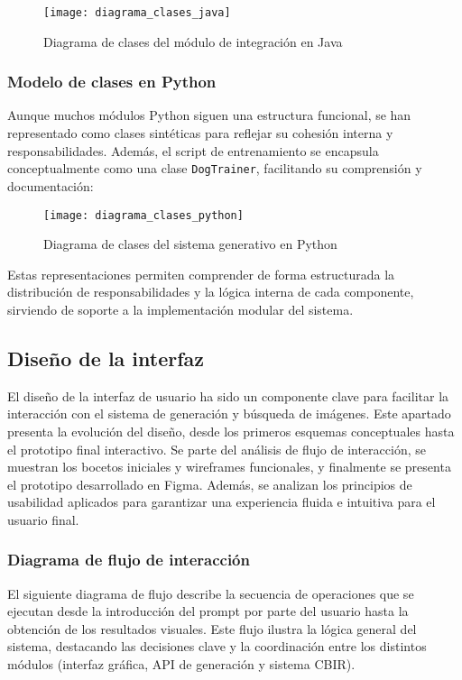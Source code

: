 \begin{figure}[H]
    \centering
    \texttt{[image: diagrama\_clases\_java]}
    \caption{Diagrama de clases del módulo de integración en Java}
    \label{fig:clases-java}
\end{figure}

\subsubsection{Modelo de clases en Python}

Aunque muchos módulos Python siguen una estructura funcional, se han representado como clases sintéticas para reflejar su cohesión interna y responsabilidades. Además, el script de entrenamiento se encapsula conceptualmente como una clase \texttt{DogTrainer}, facilitando su comprensión y documentación:

\begin{figure}[H]
    \centering
    \texttt{[image: diagrama\_clases\_python]}
    \caption{Diagrama de clases del sistema generativo en Python}
    \label{fig:clases-python}
\end{figure}

Estas representaciones permiten comprender de forma estructurada la distribución de responsabilidades y la lógica interna de cada componente, sirviendo de soporte a la implementación modular del sistema.


\subsection{Diseño de la interfaz}
El diseño de la interfaz de usuario ha sido un componente clave para facilitar la interacción con el sistema de generación y búsqueda de imágenes. Este apartado presenta la evolución del diseño, desde los primeros esquemas conceptuales hasta el prototipo final interactivo. Se parte del análisis de flujo de interacción, se muestran los bocetos iniciales y wireframes funcionales, y finalmente se presenta el prototipo desarrollado en Figma. Además, se analizan los principios de usabilidad aplicados para garantizar una experiencia fluida e intuitiva para el usuario final.

\subsubsection{Diagrama de flujo de interacción}
El siguiente diagrama de flujo describe la secuencia de operaciones que se ejecutan desde la introducción del prompt por parte del usuario hasta la obtención de los resultados visuales. Este flujo ilustra la lógica general del sistema, destacando las decisiones clave y la coordinación entre los distintos módulos (interfaz gráfica, API de generación y sistema CBIR).

